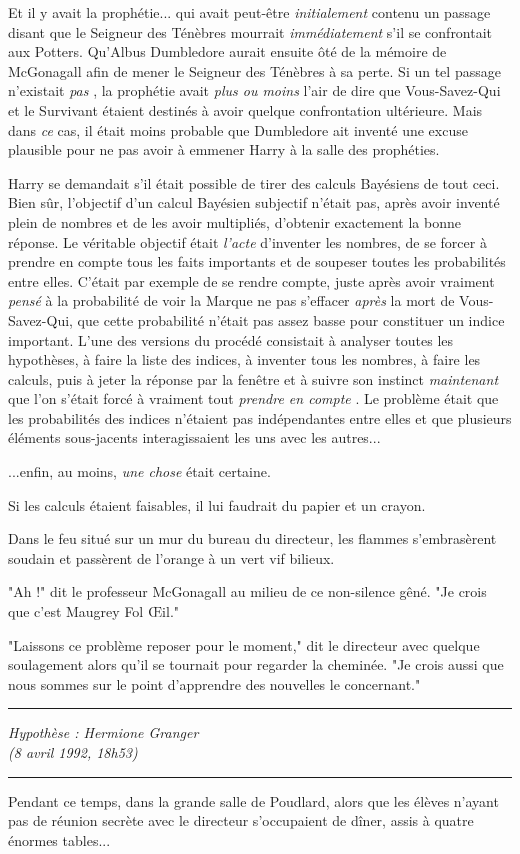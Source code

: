 Et il y avait la prophétie... qui avait peut-être \emph{initialement } contenu un passage disant que le Seigneur des Ténèbres mourrait \emph{immédiatement } s'il se confrontait aux Potters. Qu'Albus Dumbledore aurait ensuite ôté de la mémoire de McGonagall afin de mener le Seigneur des Ténèbres à sa perte. Si un tel passage n'existait \emph{pas} , la prophétie avait \emph{plus ou moins } l'air de dire que Vous-Savez-Qui et le Survivant étaient destinés à avoir quelque confrontation ultérieure. Mais dans \emph{ce}  cas, il était moins probable que Dumbledore ait inventé une excuse plausible pour ne pas avoir à emmener Harry à la salle des prophéties.

Harry se demandait s'il était possible de tirer des calculs Bayésiens de tout ceci. Bien sûr, l'objectif d'un calcul Bayésien subjectif n'était pas, après avoir inventé plein de nombres et de les avoir multipliés, d'obtenir exactement la bonne réponse. Le véritable objectif était \emph{l'acte}  d'inventer les nombres, de se forcer à prendre en compte tous les faits importants et de soupeser toutes les probabilités entre elles. C'était par exemple de se rendre compte, juste après avoir vraiment \emph{pensé}  à la probabilité de voir la Marque ne pas s'effacer \emph{après}  la mort de Vous-Savez-Qui, que cette probabilité n'était pas assez basse pour constituer un indice important. L'une des versions du procédé consistait à analyser toutes les hypothèses, à faire la liste des indices, à inventer tous les nombres, à faire les calculs, puis à jeter la réponse par la fenêtre et à suivre son instinct \emph{maintenant}  que l'on s'était forcé à vraiment tout \emph{prendre en compte} . Le problème était que les probabilités des indices n'étaient pas indépendantes entre elles et que plusieurs éléments sous-jacents interagissaient les uns avec les autres...

...enfin, au moins, \emph{une chose}  était certaine.

Si les calculs étaient faisables, il lui faudrait du papier et un crayon.

Dans le feu situé sur un mur du bureau du directeur, les flammes s'embrasèrent soudain et passèrent de l'orange à un vert vif bilieux.

"Ah !" dit le professeur McGonagall au milieu de ce non-silence gêné. "Je crois que c'est Maugrey Fol Œil."

"Laissons ce problème reposer pour le moment," dit le directeur avec quelque soulagement alors qu'il se tournait pour regarder la cheminée. "Je crois aussi que nous sommes sur le point d'apprendre des nouvelles le concernant."
\par\noindent\rule{\textwidth}{0.4pt}
\emph{Hypothèse : Hermione Granger} \\\emph{} \emph{(8 avril 1992, 18h53)} 
\par\noindent\rule{\textwidth}{0.4pt}
Pendant ce temps, dans la grande salle de Poudlard, alors que les élèves n'ayant pas de réunion secrète avec le directeur s'occupaient de dîner, assis à quatre énormes tables...

